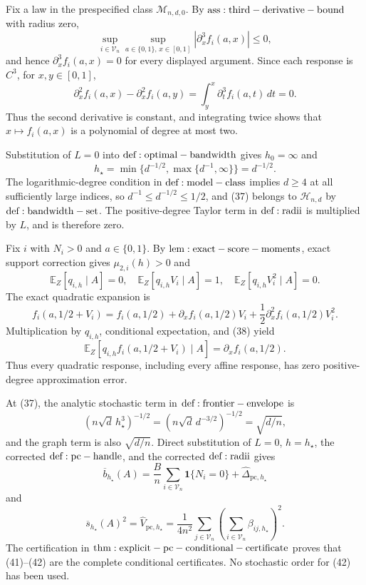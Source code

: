 Fix a law in the prespecified class \(\mathcal M_{n,d,0}\).  By \({\rm ass:third-derivative-bound}\) with radius zero,
\[
 \sup_{i\in\mathcal V_n}\sup_{a\in\{0,1\},\,x\in[0,1]}
 |\partial_x^3 f_i(a,x)|\le0,
\]
and hence \(\partial_x^3f_i(a,x)=0\) for every displayed argument.  Since each response is \(C^3\), for \(x,y\in[0,1]\),
\[
 \partial_x^2f_i(a,x)-\partial_x^2f_i(a,y)
 =\int_y^x\partial_t^3f_i(a,t)\,dt=0.
\]
Thus the second derivative is constant, and integrating twice shows that \(x\mapsto f_i(a,x)\) is a polynomial of degree at most two.

Substitution of \(L=0\) into \({\rm def:optimal-bandwidth}\) gives \(h_0=\infty\) and
\[
 h_\star=\min\{d^{-1/2},\max\{d^{-1},\infty\}\}=d^{-1/2}.
\tag{37}
\]
The logarithmic-degree condition in \({\rm def:model-class}\) implies \(d\ge4\) at all sufficiently large indices, so \(d^{-1}\le d^{-1/2}\le1/2\), and (37) belongs to \(\mathcal H_{n,d}\) by \({\rm def:bandwidth-set}\).  The positive-degree Taylor term in \({\rm def:radii}\) is multiplied by \(L\), and is therefore zero.

Fix \(i\) with \(N_i>0\) and \(a\in\{0,1\}\).  By \({\rm lem:exact-score-moments}\), exact support correction gives \(\mu_{2,i}(h)>0\) and
\[
 \mathbb E_Z[q_{i,h}\mid A]=0,
 \quad
 \mathbb E_Z[q_{i,h}V_i\mid A]=1,
 \quad
 \mathbb E_Z[q_{i,h}V_i^2\mid A]=0.
\tag{38}
\]
The exact quadratic expansion is
\[
 f_i(a,1/2+V_i)
 =f_i(a,1/2)+\partial_xf_i(a,1/2)V_i
 +\frac12\partial_x^2f_i(a,1/2)V_i^2.
\]
Multiplication by \(q_{i,h}\), conditional expectation, and (38) yield
\[
 \mathbb E_Z[q_{i,h}f_i(a,1/2+V_i)\mid A]
 =\partial_xf_i(a,1/2).
\tag{39}
\]
Thus every quadratic response, including every affine response, has zero positive-degree approximation error.

At (37), the analytic stochastic term in \({\rm def:frontier-envelope}\) is
\[
 (n\sqrt d\,h_\star^3)^{-1/2}
 =(n\sqrt d\,d^{-3/2})^{-1/2}=\sqrt{d/n},
\tag{40}
\]
and the graph term is also \(\sqrt{d/n}\).  Direct substitution of \(L=0\), \(h=h_\star\), the corrected \({\rm def:pc-handle}\), and the corrected \({\rm def:radii}\) gives
\[
 \overline b_{h_\star}(A)
 =\frac Bn\sum_{i\in\mathcal V_n}\mathbf1\{N_i=0\}
 +\widehat\Delta_{\mathrm{pc},h_\star}
\tag{41}
\]
and
\[
 \overline s_{h_\star}(A)^2
 =\widehat V_{\mathrm{pc},h_\star}
 =\frac1{4n^2}\sum_{j\in\mathcal V_n}
 \left(\sum_{i\in\mathcal V_n}\beta_{ij,h_\star}\right)^2.
\tag{42}
\]
The certification in \({\rm thm:explicit-pc-conditional-certificate}\) proves that (41)--(42) are the complete conditional certificates.  No stochastic order for (42) has been used.

